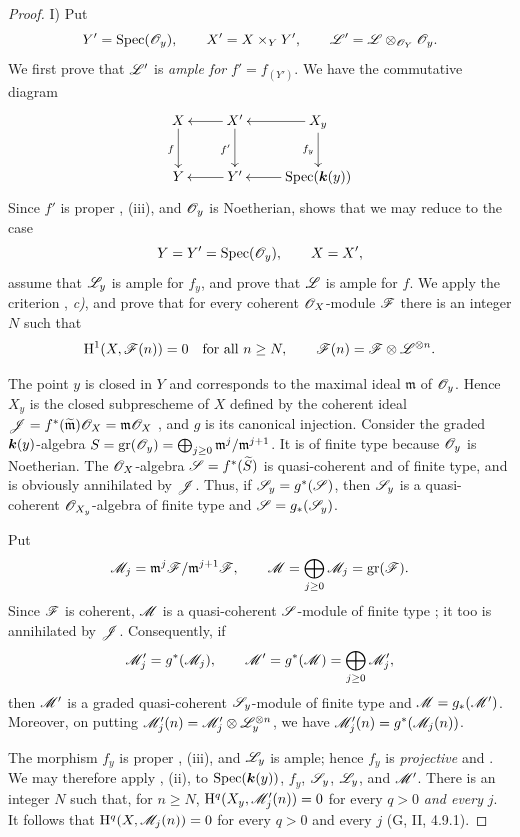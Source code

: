 \begin{proof}

\noindent I) Put
\[
  Y'=\operatorname{Spec}(\mathscr{O}_y),\qquad
  X'=X\times_Y Y',\qquad
  \mathscr{L}'=\mathscr{L}\otimes_{\mathscr{O}_Y}\mathscr{O}_y.
\]
We first prove that $\mathscr{L}'$ is \emph{ample for} $f'=f_{(Y')}$.  We have
the commutative diagram
\[
  \xymatrix{
    X\ar[d]_f
      &
    X'\ar[l]\ar[d]_{f'}
      &
    X_y\ar[l]\ar[d]_{f_y}
    \\
    Y
      &
    Y'\ar[l]
      &
    \Spec(\kres(y))\ar[l].
  }
\]
Since $f'$ is proper , (iii), and $\mathscr{O}_y$ is
Noetherian,  shows that we may reduce to the case
\[
  Y=Y'=\operatorname{Spec}(\mathscr{O}_y),\qquad X=X',
\]
assume that $\mathscr{L}_y$ is ample for $f_y$, and prove that $\mathscr{L}$
is ample for $f$.  We apply the criterion
, \emph{c)}, and prove that for every coherent
$\mathscr{O}_X$-module $\mathscr{F}$ there is an integer $N$ such that
\[
  \mathrm{H}^1(X,\mathscr{F}(n))=0
  \quad\text{for all }n\geq N,
  \qquad
  \mathscr{F}(n)=\mathscr{F}\otimes\mathscr{L}^{\otimes n}.
\]

The point $y$ is closed in $Y$ and corresponds to the maximal ideal
$\mathfrak m$ of $\mathscr{O}_y$.  Hence $X_y$ is the closed
subprescheme of $X$ defined by the coherent ideal $\mathscr{J}
=
f^*(\widetilde{\mathfrak m})\mathscr{O}_X
=
\mathfrak m\mathscr{O}_X$
, and $g$ is its canonical injection.  Consider
the graded $\boldsymbol{k}(y)$-algebra $S=\operatorname{gr}(\mathscr{O}_y)
=\bigoplus_{j\geq0}
\mathfrak m^j/\mathfrak m^{j+1}$.
It is of finite type because $\mathscr{O}_y$ is Noetherian.  The
$\mathscr{O}_X$-algebra $\mathscr{S}=f^*(\widetilde S)$
is quasi-coherent and of finite type, and is obviously annihilated by
$\mathscr{J}$.  Thus, if $\mathscr{S}_y=g^*(\mathscr{S})$, then $\mathscr{S}_y$ is a
quasi-coherent $\mathscr{O}_{X_y}$-algebra of finite type and $\mathscr{S}=g_*(\mathscr{S}_y)$.

Put
\[
  \mathscr{M}_j
  =
  \mathfrak m^j\mathscr{F}/\mathfrak m^{j+1}\mathscr{F},
  \qquad
  \mathscr{M}
  =
  \bigoplus_{j\geq0}\mathscr{M}_j
  =
  \operatorname{gr}(\mathscr{F}).
\]
Since $\mathscr{F}$ is coherent, $\mathscr{M}$ is a quasi-coherent
$\mathscr{S}$-module of finite type ; it too is
annihilated by $\mathscr{J}$.  Consequently, if
\[
  \mathscr{M}'_j=g^*(\mathscr{M}_j),
  \qquad
  \mathscr{M}'=g^*(\mathscr{M})
    =\bigoplus_{j\geq0}\mathscr{M}'_j,
\]
then $\mathscr{M}'$ is a graded quasi-coherent $\mathscr{S}_y$-module of
finite type and $\mathscr{M}=g_*(\mathscr{M}')$.  Moreover, on putting $\mathscr{M}'_j(n)
=
\mathscr{M}'_j\otimes\mathscr{L}_y^{\otimes n}$,
we have $\mathscr{M}'_j(n)=g^*(\mathscr{M}_j(n))$.

The morphism $f_y$ is proper , (iii), and
$\mathscr{L}_y$ is ample; hence $f_y$ is \emph{projective}
 and .  We may therefore apply
, (ii), to
$\operatorname{Spec}(\boldsymbol{k}(y))$, $f_y$, $\mathscr{S}_y$, $\mathscr{L}_y$, and $\mathscr{M}'$.
There is an integer $N$ such that, for $n\geq N$, $\mathrm{H}^q(X_y,\mathscr{M}'_j(n))=0$
for every $q>0$ \emph{and every} $j$.  It follows that $\mathrm{H}^q(X,\mathscr{M}_j(n))=0$
for every $q>0$ and every $j$ (G, II, 4.9.1).


\end{proof}
